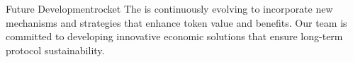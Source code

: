 \begin{mfai-box-scale}{Future Development}{rocket}
The  is continuously evolving to incorporate new mechanisms and strategies that enhance token value and  benefits. Our team is committed to developing innovative economic solutions that ensure long-term protocol sustainability.
\end{mfai-box-scale}

\newpage 